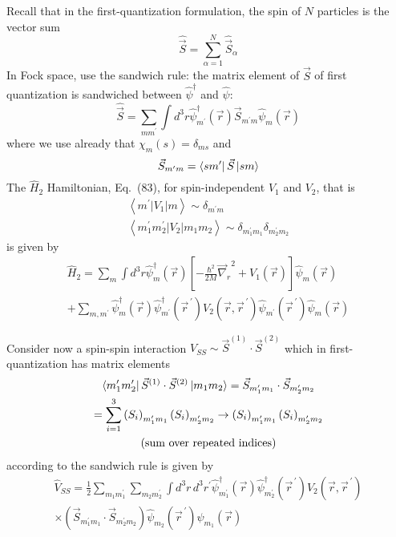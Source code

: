 \documentclass[12pt]{article}
\newcommand{\be}{\begin{equation}}
\newcommand{\ee}{\end{equation}}
\newcommand{\vecrp}{\ensuremath{\vec{r}^{\,\prime}}}
\newcommand{\vecnr}{\ensuremath{\vec{\nabla}_{\!r}}}
\begin{document}
Recall that in the first-quantization formulation, the 
spin of $N$ particles is the vector sum
\be
\hat{\vec{S}} = \sum_{\alpha=1}^N \hat{\vec{S}}_\alpha 
\ee
In Fock space, use the sandwich rule: the matrix element
of $\vec{S}$ of first quantization is sandwiched between $\hat{\psi}^\dagger$ and $\hat{\psi}$:
\be
\hat{\vec{S}}=\sum_{mm^\prime} \int d^3 r \hat{\psi}_{m^{\prime}}^{\dagger}(\vec{r}) \vec{S}_{m^{\prime} m} \hat{\psi}_{m}(\vec{r})
\ee
where we use already that $\chi_m(s) = \delta_{ms}$ and
\be
\vec{S}_{m^\prime m} = \bra{sm^\prime}\vec{S}\ket{sm}
\ee
The $\hat{H}_2$ Hamiltonian, %
Eq.~(83), 
for spin-independent
$V_1$ and $V_2$, that is
\be
\begin{gathered}
\left\langle m^{\prime}\left|V_{1}\right| m\right\rangle \sim \delta_{m^{\prime} m}\\
\left\langle m_{1}^{\prime} m_{2}^{\prime}\left|V_{2}\right| m_{1} m_{2}\right\rangle \sim \delta_{m_{1}^{\prime} m_{1}} \delta_{m_{2}^{\prime} m_{2}}
\end{gathered}
\ee
is given by
\be
\begin{gathered}
\hat{H}_2 = \sum_{m} \int d^{3} r \hat{\psi}_{m}^{\dagger}(\vec{r})\left[-\frac{\hbar^{2}}{2 M} \vecnr^{2}+V_{1}(\vec{r})\right] \hat{\psi}_{m}(\vec{r})\\
+ \sum_{m,m^\prime}
\hat{\psi}_{m}^{\dagger}(\vec{r}) \hat{\psi}_{m^\prime}^{\dagger}(\vecrp)
V_2(\vec{r},\vecrp)
\hat{\psi}_{m^\prime}(\vecrp)\hat{\psi}_{m}(\vec{r})
\end{gathered}
\ee

Consider now a spin-spin interaction $V_{SS}\sim\vec{S}^{(1)} \cdot \vec{S}^{(2)}$ which in
first-quantization has matrix elements
\be
\begin{gathered}
\bra{m_1^\prime m_2^\prime}\vec{S}^{(1)} \cdot \vec{S}^{(2)}\ket{m_1 m_2}
= \vec{S}_{m_1^\prime m_1} \cdot \vec{S}_{m_2^\prime m_2}\\
= \sum_{i=1}^3 \left(S_i\right)_{m_1^\prime m_1}\left(S_i\right)_{m_2^\prime m_2}
\rightarrow \left(S_i\right)_{m_1^\prime m_1}\left(S_i\right)_{m_2^\prime m_2}\\
\text{(sum over repeated indices)}
\end{gathered}
\ee
according to the sandwich rule is given by
\be
\begin{gathered}
\hat{V}_{SS} =\frac{1}{2} \sum_{m_1m_1^\prime}\sum_{m_2m_2^\prime} \int d^3r\,d^3r^\prime
\hat{\psi}_{m_1^\prime}^{\dagger}(\vec{r}) \hat{\psi}_{m_2^\prime}^{\dagger}(\vecrp)
V_2(\vec{r},\vecrp)\\
\times 
\left(\vec{S}_{m_1^\prime m_1} \cdot \vec{S}_{m_2^\prime m_2}\right)
\hat{\psi}_{m_2}(\vecrp)\hat{\psi}_{m_1}(\vec{r})
\end{gathered}
\ee
\end{document}

